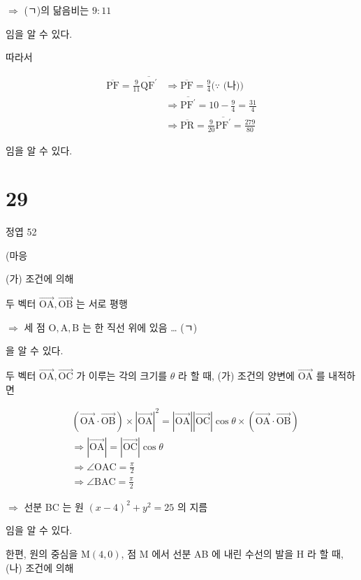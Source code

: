 \documentclass[10pt]{article}
\begin{document}
\(\Rightarrow\) (ㄱ)의 닮음비는 \(9: 11\)

임을 알 수 있다.

따라서

\[
\begin{aligned}
\overline{\mathrm{PF}}=\frac{9}{11} \overline{\mathrm{QF}^{\prime}} & \Rightarrow \overline{\mathrm{PF}}=\frac{9}{4}(\because \text { (나)) } \\
& \Rightarrow \overline{\mathrm{PF}^{\prime}}=10-\frac{9}{4}=\frac{31}{4} \\
& \Rightarrow \overline{\mathrm{PR}}=\frac{9}{20} \overline{\mathrm{PF}^{\prime}}=\frac{279}{80}
\end{aligned}
\]

임을 알 수 있다.

\section*{29}
정엽 52

(마응

(가) 조건에 의해

두 벡터 \(\overrightarrow{\mathrm{OA}}, \overrightarrow{\mathrm{OB}}\) 는 서로 평행

\(\Rightarrow\) 세 점 \(\mathrm{O}, \mathrm{A}, \mathrm{B}\) 는 한 직선 위에 있음 … (ㄱ)

을 알 수 있다.

두 벡터 \(\overrightarrow{\mathrm{OA}}, \overrightarrow{\mathrm{OC}}\) 가 이루는 각의 크기를 \(\theta\) 라 할 때, (가) 조건의 양변에 \(\overrightarrow{\mathrm{OA}}\) 를 내적하면

\[
\begin{aligned}
& (\overrightarrow{\mathrm{OA}} \cdot \overrightarrow{\mathrm{OB}}) \times|\overrightarrow{\mathrm{OA}}|^{2}=|\overrightarrow{\mathrm{OA}}||\overrightarrow{\mathrm{OC}}| \cos \theta \times(\overrightarrow{\mathrm{OA}} \cdot \overrightarrow{\mathrm{OB}}) \\
& \Rightarrow|\overrightarrow{\mathrm{OA}}|=|\overrightarrow{\mathrm{OC}}| \cos \theta \\
& \Rightarrow \angle \mathrm{OAC}=\frac{\pi}{2} \\
& \Rightarrow \angle \mathrm{BAC}=\frac{\pi}{2}
\end{aligned}
\]

\(\Rightarrow\) 선분 BC 는 원 \((x-4)^{2}+y^{2}=25\) 의 지름

임을 알 수 있다.

한편, 원의 중심을 \(\mathrm{M}(4,0)\), 점 M 에서 선분 AB 에 내린 수선의 발을 H 라 할 때, (나) 조건에 의해
\end{document}

